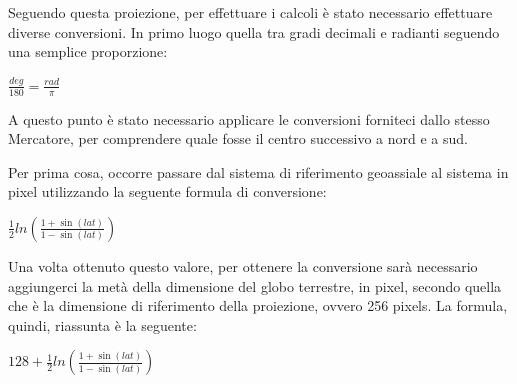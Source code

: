 Seguendo questa proiezione, per effettuare i calcoli è stato necessario effettuare diverse conversioni. In primo luogo quella tra gradi decimali e radianti seguendo una semplice proporzione:
\begin{center}

	\Large$ \frac{deg}{180} = \frac{rad}{\pi} $\par

\end{center}

A questo punto è stato necessario applicare le conversioni forniteci dallo stesso Mercatore, per comprendere quale fosse il centro successivo a nord e a sud. 

Per prima cosa, occorre passare dal sistema di riferimento geoassiale al sistema in pixel utilizzando la seguente formula di conversione:
\begin{center}

	\large$ \frac{1}{2}ln(\frac{1+\sin(lat)}{1-\sin(lat)}) $

\end{center}
Una volta ottenuto questo valore, per ottenere la conversione sarà necessario aggiungerci la metà della dimensione del globo terrestre, in pixel, secondo quella che è la dimensione di riferimento della proiezione, ovvero 256 pixels. La formula, quindi, riassunta è la seguente:
\begin{center}

	\large$ 128 + \frac{1}{2}ln(\frac{1+\sin(lat)}{1-\sin(lat)}) $

\end{center}